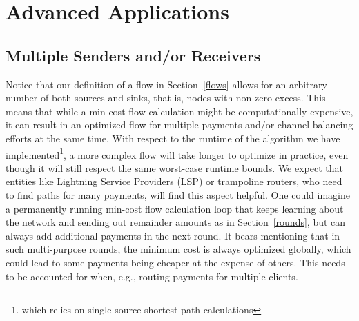 \documentclass[10pt,twocolumn]{article}
\begin{document}
\section{Advanced Applications}


\subsection{Multiple Senders and/or Receivers}

Notice that our definition of a flow in Section~\ref{flows} allows for an arbitrary number of both sources and sinks, that is, nodes with non-zero excess. This means that while a min-cost flow calculation might be computationally expensive, it can result in an optimized flow for multiple payments and/or channel balancing efforts at the same time. With respect to the runtime of the algorithm we have implemented\footnote{which relies on single source shortest path calculations}, a more complex flow will take longer to optimize in practice, even though it will still respect the same worst-case runtime bounds.
We expect that entities like Lightning Service Providers (LSP) or trampoline routers, who need to find paths for many payments, will find this aspect helpful.
One could imagine a permanently running min-cost flow calculation loop that keeps learning about the network and sending out remainder amounts as in Section~\ref{rounds}, but can always add additional payments in the next round.
It bears mentioning that in such multi-purpose rounds, the minimum cost is always optimized globally, which could lead to some payments being cheaper at the expense of others.
This needs to be accounted for when, e.g., routing payments for multiple clients.
\end{document}
